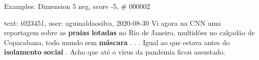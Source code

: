 \begin{frame}{Examples: Dimension 5 neg, score -5, \# 000002}
\footnotesize
\begin{alertblock}{text: t023451, user: aguinaldaosilva, 2020-08-30}
Vi agora na CNN uma reportagem sobre as \textbf{praias} \textbf{lotadas} no Rio 
de Janeiro, multidões no calçadão de Copacabana, todo mundo sem 
\textbf{máscara} . . . Igual ao que estava antes do \textbf{isolamento} 
\textbf{social} . Acho que até o vírus da pandemia ficou assustado. 
\end{alertblock}
\end{frame}
